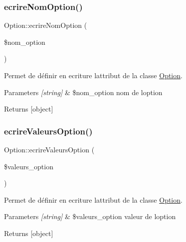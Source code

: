 \subsubsection{\texorpdfstring{ecrire\+Nom\+Option()}{ecrireNomOption()}}
{\footnotesize\ttfamily Option\+::ecrire\+Nom\+Option (\begin{DoxyParamCaption}\item[{}]{\$nom\+\_\+option }\end{DoxyParamCaption})}



Permet de définir en ecriture l\textquotesingle{}attribut de la classe \hyperlink{class_option}{Option}. 


\begin{DoxyParams}{Parameters}
{\em \mbox{[}string\mbox{]}} & \$nom\+\_\+option nom de l\textquotesingle{}option \\
\hline
\end{DoxyParams}
\begin{DoxyReturn}{Returns}
\mbox{[}object\mbox{]} 
\end{DoxyReturn}
\mbox{\label{class_option_ad771adcf22b0133117ff87d5f04a51ad}} 
\subsubsection{\texorpdfstring{ecrire\+Valeurs\+Option()}{ecrireValeursOption()}}
{\footnotesize\ttfamily Option\+::ecrire\+Valeurs\+Option (\begin{DoxyParamCaption}\item[{}]{\$valeurs\+\_\+option }\end{DoxyParamCaption})}



Permet de définir en ecriture l\textquotesingle{}attribut de la classe \hyperlink{class_option}{Option}. 


\begin{DoxyParams}{Parameters}
{\em \mbox{[}string\mbox{]}} & \$valeurs\+\_\+option valeur de l\textquotesingle{}option \\
\hline
\end{DoxyParams}
\begin{DoxyReturn}{Returns}
\mbox{[}object\mbox{]} 
\end{DoxyReturn}
\mbox{\label{class_option_aa52b0c018581de4d363643512ced3363}} 
